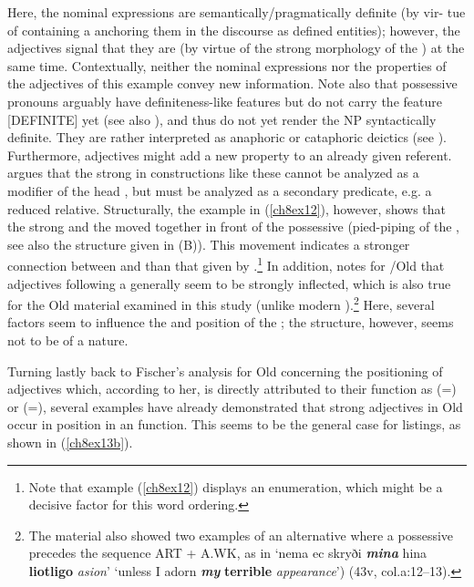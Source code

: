\documentclass[output=paper,colorlinks,citecolor=brown]{langscibook}
\begin{document}
Here, the nominal expressions are semantically/pragmatically definite
(by vir- tue of containing a  anchoring them in the
discourse as defined entities); however, the adjectives signal that they are  (by virtue of the strong morphology of the ) at the same time. Contextually, neither the nominal expressions nor the
properties of the adjectives of this example convey new information.
Note also that possessive pronouns arguably have definiteness-like
features but do not carry the feature {[}DEFINITE{]} yet (see also \citealp{Borjarsetal16}), and thus do not yet render the NP syntactically
definite. They are rather interpreted as anaphoric or cataphoric
deictics (see \citealp{Tiemann2023}). Furthermore, adjectives might add a
new property to an already given referent. \citet[257ff, 265ff]{Fischer01} argues that the strong  in constructions like these
cannot be analyzed as a modifier of the head , but must be analyzed
as a secondary predicate, e.g. a reduced relative. Structurally, the
example in (\ref{ch8ex12}), however, shows that the strong  and the 
moved together in front of the possessive (pied-piping of the
, see also the structure given in (B)). This movement indicates a
stronger connection between  and  than that given by
.\footnote{Note that example (\ref{ch8ex12}) displays an enumeration,
  which might be a decisive factor for this word ordering.} In addition,
\citet[26]{Pfaff2019} notes for /Old  that adjectives
following a  generally seem to be strongly inflected, which is also true for the Old
 material examined in this study (unlike modern ).\footnote{The  material
  also showed two examples of an alternative  where a possessive
  precedes the sequence ART + A.WK, as in `nema ec skryði \textit{\textbf{mina}}
  hina \textbf{liotligo} \textit{asion}' `unless I adorn \textbf{\textit{my}} \textbf{terrible} \textit{appearance}') (43v, col.a:12--13).} Here, several factors seem to
influence the  and position of the ; the structure,
however, seems not to be of a  nature.

Turning lastly back to Fischer's \citeyearpar{Fischer00, Fischer01} analysis for Old  concerning the positioning of
adjectives which, according to her, is directly attributed to their
function as  (=) or  (=),
several examples have already demonstrated that strong adjectives in Old 
occur in  position in an  function. This seems to
be the general case for listings, as shown in (\ref{ch8ex13b}).
\end{document}
